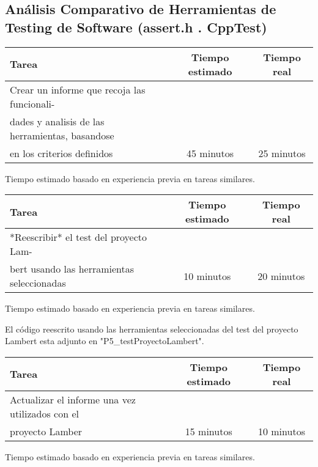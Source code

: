\documentclass[12pt,a4paper]{article}
\begin{document}
\subsection{Análisis Comparativo de Herramientas de Testing de Software (assert.h . CppTest)}
    \begin{center}
        \begin{tabular}{|l|c|c|}
            \hline
            \textbf{Tarea} & \textbf{Tiempo estimado} & \textbf{Tiempo real} \\
            \hline
            Crear un informe que recoja las funcionali-
\\dades y analisis de las herramientas, basandose
\\en los criterios definidos  & 45 minutos & 25 minutos \\
            \hline
        \end{tabular}
    \end{center}
    \begin{center}
        Tiempo estimado basado en experiencia previa en tareas similares.
    \end{center}
    \begin{center}
        \begin{tabular}{|l|c|c|}
            \hline
            \textbf{Tarea} & \textbf{Tiempo estimado} & \textbf{Tiempo real} \\
            \hline
            *Reescribir* el test del proyecto Lam-
\\bert usando las herramientas seleccionadas & 10 minutos & 20 minutos \\
            \hline
        \end{tabular}
    \end{center}
    \begin{center}
        Tiempo estimado basado en experiencia previa en tareas similares.
    \end{center}
El código reescrito usando las herramientas seleccionadas del test del proyecto Lambert esta adjunto en "P5\_testProyectoLambert\/".
    \begin{center}
        \begin{tabular}{|l|c|c|}
            \hline
            \textbf{Tarea} & \textbf{Tiempo estimado} & \textbf{Tiempo real} \\
            \hline
            Actualizar el informe una vez utilizados con el
\\proyecto Lamber & 15 minutos & 10 minutos \\
            \hline
        \end{tabular}
    \end{center}
    \begin{center}
        Tiempo estimado basado en experiencia previa en tareas similares.
    \end{center}
\end{document}
